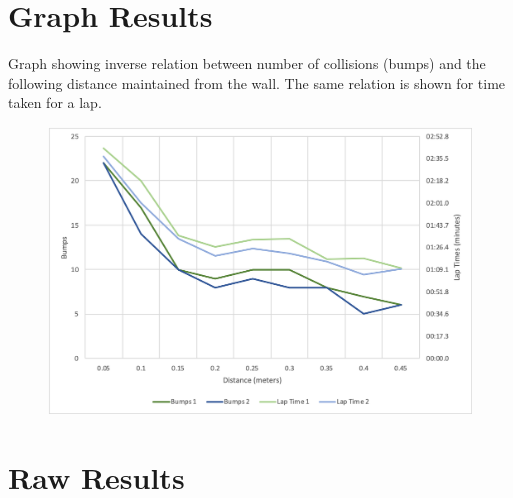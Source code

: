 \documentclass[a4paper,12pt,twocolumn]{article}
\begin{document}
\begin{appendices}
\section{Graph Results}
\label{sec:graph-results}
Graph showing inverse relation between number of collisions (bumps) and the following distance maintained from the wall. The same relation is shown for time taken for a lap.
\begin{figure}[ht]
\centering
\includegraphics[width=0.65\linewidth]{figures/results_graph.png}
\end{figure}

\section{Raw Results}
\label{sec:raw-results}

\end{appendices}


\clearpage


\end{document}
